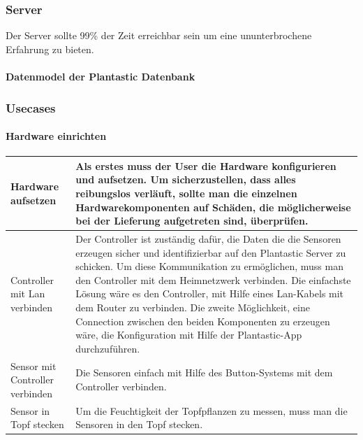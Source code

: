 \documentclass[12pt]{article}
\theoremstyle{definition}
\begin{document}
\begin{flushleft}

\end{flushleft}

\subsubsection{Server}
Der Server sollte 99\% der Zeit erreichbar sein um eine ununterbrochene Erfahrung zu bieten.\\
\paragraph{Datenmodel der Plantastic Datenbank}
\begin{center}

\end{center}
\pagebreak

\subsubsection{Usecases}
\paragraph{Hardware einrichten}
\begin{center}

\end{center}
\begin{center}
\begin{tabular}{| L{3cm} | C{12cm} |}
\hline
Hardware aufsetzen & Als erstes muss der User die Hardware konfigurieren und aufsetzen.
Um sicherzustellen, dass alles reibungslos verläuft, sollte man die einzelnen Hardwarekomponenten auf Schäden, die möglicherweise bei der Lieferung aufgetreten sind, überprüfen. \\

\hline
Controller mit Lan verbinden & Der Controller ist zuständig dafür, die Daten die die Sensoren erzeugen sicher und identifizierbar auf den Plantastic Server zu schicken. Um diese Kommunikation zu ermöglichen, muss man den Controller mit dem Heimnetzwerk verbinden. Die einfachste Lösung wäre es den Controller, mit Hilfe eines Lan-Kabels mit dem Router zu verbinden. Die zweite Möglichkeit, eine Connection zwischen den beiden Komponenten zu erzeugen wäre, die Konfiguration mit Hilfe der Plantastic-App durchzuführen. \\

\hline
Sensor mit Controller verbinden & Die Sensoren einfach mit Hilfe des Button-Systems mit dem Controller verbinden.\\

\hline
Sensor in Topf stecken & Um die Feuchtigkeit der Topfpflanzen zu messen, muss man die Sensoren in den Topf stecken. \\
\hline
\end{tabular}
\end{center}
\newpage
\end{document}
